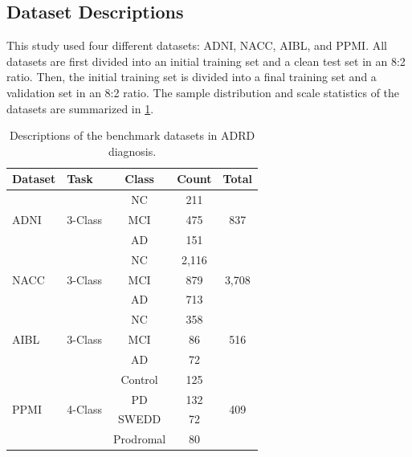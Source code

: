 \documentclass[lettersize,journal]{IEEEtran}
\begin{document}
\subsection{Dataset Descriptions}

    This study used four different datasets: ADNI\cite{weiner2013adni}, NACC\cite{beekly2007nacc}, AIBL\cite{ellis2009aibl}, and PPMI\cite{marek2011ppmi}. All datasets are first divided into an initial training set and a clean test set in an 8:2 ratio. Then, the initial training set is divided into a final training set and a validation set in an 8:2 ratio. The sample distribution and scale statistics of the datasets are summarized in \cref{tab:dataset_statistics}.

    \begin{table}[htbp]
        \centering
        \caption{Descriptions of the benchmark datasets in ADRD diagnosis.}
        \label{tab:dataset_statistics}
        \begin{tabular}{llccc}
            \toprule
            \textbf{Dataset} & \textbf{Task} & \textbf{Class} & \textbf{Count} & \textbf{Total} \\
            \midrule
            \multirow{3}{*}{ADNI} & \multirow{3}{*}{3-Class} & NC & 211 & \multirow{3}{*}{837} \\
            & & MCI & 475 & \\
            & & AD & 151 & \\
            \midrule
            \multirow{3}{*}{NACC} & \multirow{3}{*}{3-Class} & NC & 2,116 & \multirow{3}{*}{3,708} \\
            & & MCI & 879 & \\
            & & AD & 713 & \\
            \midrule
            \multirow{3}{*}{AIBL} & \multirow{3}{*}{3-Class} & NC & 358 & \multirow{3}{*}{516} \\
            & & MCI & 86 & \\
            & & AD & 72 & \\
            \midrule
            \multirow{4}{*}{PPMI} & \multirow{4}{*}{4-Class} & Control & 125 & \multirow{4}{*}{409} \\
            & & PD & 132 & \\
            & & SWEDD & 72 & \\
            & & Prodromal & 80 & \\
            \bottomrule
        \end{tabular}
    \end{table}
\end{document}

